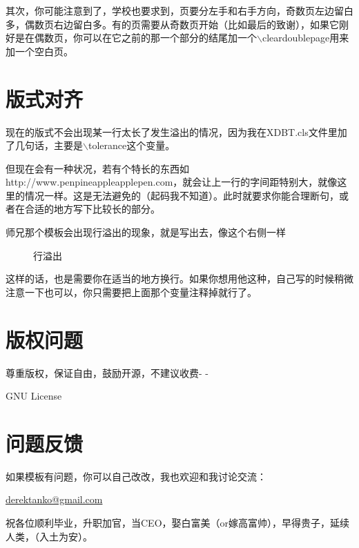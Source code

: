 其次，你可能注意到了，学校也要求到，页要分左手和右手方向，奇数页左边留白多，偶数页右边留白多。有的页需要从奇数页开始（比如最后的致谢），如果它刚好是在偶数页，你可以在它之前的那一个部分的结尾加一个$\backslash$cleardoublepage用来加一个空白页。

\section{版式对齐}

现在的版式不会出现某一行太长了发生溢出的情况，因为我在XDBT.cls文件里加了几句话，主要是$\backslash$tolerance这个变量。

但现在会有一种状况，若有个特长的东西如http://www.penpineappleapplepen.com，就会让上一行的字间距特别大，就像这里的情况一样。这是无法避免的（起码我不知道）。此时就要求你能合理断句，或者在合适的地方写下比较长的部分。

师兄那个模板会出现行溢出的现象，就是写出去，像这个右侧一样
\begin{figure}[h]
 \centering
 \caption{行溢出}
 \label{fig:amss1}
\end{figure}

这样的话，也是需要你在适当的地方换行。如果你想用他这种，自己写的时候稍微注意一下也可以，你只需要把上面那个变量注释掉就行了。

\section{版权问题}

尊重版权，保证自由，鼓励开源，不建议收费- -

GNU License

\section{问题反馈}

如果模板有问题，你可以自己改改，我也欢迎和我讨论交流：

\href{derektanko@gmail.com}{derektanko@gmail.com}

祝各位顺利毕业，升职加官，当CEO，娶白富美（or嫁高富帅），早得贵子，延续人类，（入土为安）。